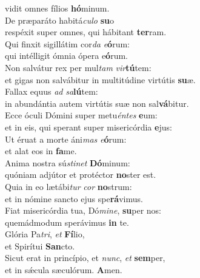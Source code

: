 \oddverse vidit omnes fílios \textbf{hó}minum.\\
\evenverse De præparáto habitá\textit{cu}\textit{lo} \textbf{su}o~\*\\
\evenverse respéxit super omnes, qui hábitant \textbf{ter}ram.\\
\oddverse Qui finxit sigillátim cor\textit{da} \textit{e}\textbf{ó}rum:~\*\\
\oddverse qui intélligit ómnia ópera e\textbf{ó}rum.\\
\evenverse Non salvátur rex per mul\textit{tam} \textit{vir}\textbf{tú}tem:~\*\\
\evenverse et gigas non salvábitur in multitúdine virtútis \textbf{su}æ.\\
\oddverse Fallax equus \textit{ad} \textit{sa}\textbf{lú}tem:~\*\\
\oddverse in abundántia autem virtútis suæ non sal\textbf{vá}bitur.\\
\evenverse Ecce óculi Dómini super metu\textit{én}\textit{tes} \textbf{e}um:~\*\\
\evenverse et in eis, qui sperant super misericórdia \textbf{e}jus:\\
\oddverse Ut éruat a morte áni\textit{mas} \textit{e}\textbf{ó}rum:~\*\\
\oddverse et alat eos in \textbf{fa}me.\\
\evenverse Anima nostra sú\textit{sti}\textit{net} \textbf{Dó}minum:~\*\\
\evenverse quóniam adjútor et protéctor \textbf{no}ster est.\\
\oddverse Quia in eo lætábi\textit{tur} \textit{cor} \textbf{no}strum:~\*\\
\oddverse et in nómine sancto ejus spe\textbf{rá}vimus.\\
\evenverse Fiat misericórdia tua, Dó\textit{mi}\textit{ne}, \textbf{su}per nos:~\*\\
\evenverse quemádmodum sperávimus \textbf{in} te.\\
\oddverse Glória Pa\textit{tri}, \textit{et} \textbf{Fí}lio,~\*\\
\oddverse et Spirítui \textbf{San}cto.\\
\evenverse Sicut erat in princípio, et \textit{nunc}, \textit{et} \textbf{sem}per,~\*\\
\evenverse et in sǽcula sæculórum. \textbf{A}men.\\
